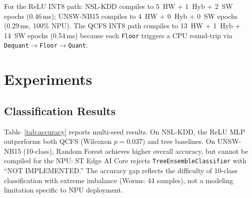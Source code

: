 \documentclass[conference]{IEEEtran}
\begin{document}
For the ReLU INT8 path:
NSL-KDD compiles to 5~HW + 1~Hyb + 2~SW epochs (0.46\,ms);
UNSW-NB15 compiles to 4~HW + 0~Hyb + 0~SW epochs (0.29\,ms, 100\% NPU).
The QCFS INT8 path compiles to 13~HW + 1~Hyb + 14~SW epochs (0.54\,ms)
because each \texttt{Floor} triggers a CPU round-trip via
\mbox{\texttt{Dequant}}$\to$\mbox{\texttt{Floor}}$\to$\mbox{\texttt{Quant}}.

\section{Experiments}
\label{sec:experiments}

\subsection{Classification Results}

\begin{table}[t]
\centering
\caption{Test accuracy (\%, mean$\pm$std, 10 seeds). MLP is the only
model eligible for NPU acceleration.}
\label{tab:accuracy}
\small
{}
\end{table}

Table~\ref{tab:accuracy} reports multi-seed results.
On NSL-KDD, the ReLU MLP outperforms both QCFS (Wilcoxon $p{=}0.037$)
and tree baselines.
On UNSW-NB15 (10-class), Random Forest achieves higher overall accuracy,
but cannot be compiled for the NPU:
ST Edge AI Core rejects \texttt{TreeEnsembleClassifier} with
``NOT IMPLEMENTED.''
The accuracy gap reflects the difficulty of 10-class classification
with extreme imbalance (Worms: 44 samples), not a modeling limitation
specific to NPU deployment.
\end{document}
